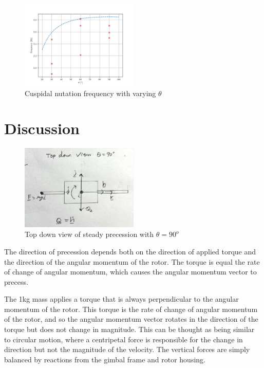 \documentclass[8pt]{article}
\begin{document}
\begin{figure}
    \centering
    \includegraphics[width=0.5\textwidth]{cuspidal_nutation.png}
    \caption{Cuspidal nutation frequency with varying $\theta$}
    \label{fig:cuspidal_nutation}
\end{figure}

\section{Discussion}

\begin{figure}[H]
    \centering
    \includegraphics[width=0.5\textwidth]{top_down_precession.jpg}
    \caption{Top down view of steady precession with $\theta = 90^o$}
    \label{fig:precession_vs_mass}
\end{figure}


The direction of precession depends both on the direction of applied torque and the direction of the angular momentum of the rotor.
The torque is equal the rate of change of angular momentum, which causes the angular momentum vector to precess.


The 1kg mass applies a torque that is always perpendicular to the angular momentum of the rotor.
This torque is the rate of change of angular momentum of the rotor, and so the angular momentum vector rotates in the direction of the torque but does not change in magnitude.
This can be thought as being similar to circular motion, where a centripetal force is responsible for the change in direction but not the magnitude of the velocity.
The vertical forces are simply balanced by reactions from the gimbal frame and rotor housing.
\end{document}
